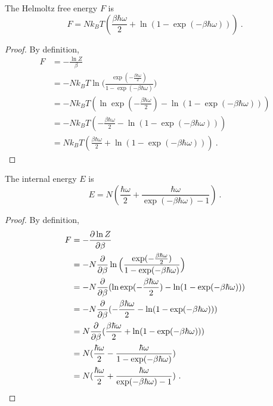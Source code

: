     The Helmoltz free energy $F$ is 
    \begin{equation*}
        F = N k_B T ( \frac{\beta \hbar \omega}{2} + \ln (1 - \exp(- \beta \hbar \omega))) ~.
    \end{equation*}
    \begin{proof}
        By definition, 
        \begin{equation*}
        \begin{aligned}
            F & = - \frac{\ln Z}{\beta} \\ & = - N k_B T \ln \Big ( \frac{\exp(- \frac{\beta \hbar \omega}{2})}{1 - \exp(- \beta \hbar \omega)} \Big) \\ & = - N k_B T ( \ln \exp(- \frac{\beta \hbar \omega}{2}) - \ln (1 - \exp(- \beta \hbar \omega) )) \\ & = - N k_B T ( - \frac{\beta \hbar \omega}{2} - \ln (1 - \exp(- \beta \hbar \omega))) \\ & = N k_B T ( \frac{\beta \hbar \omega}{2} + \ln (1 - \exp(- \beta \hbar \omega))) ~.
        \end{aligned}
        \end{equation*}
    \end{proof}

    The internal energy $E$ is 
    \begin{equation*}
        E = N ( \frac{\hbar \omega}{2} + \frac{\hbar \omega}{\exp(- \beta \hbar \omega) - 1} ) ~.
    \end{equation*}
    \begin{proof}
        By definition, 
        \begin{equation*}
        \begin{aligned}
            F & = - \frac{\partial\ln Z}{\partial\beta} \\ & = - N \frac{\partial}{\partial\beta} \ln \Big ( \frac{\exp(- \frac{\beta \hbar \omega}{2})}{1 - \exp(- \beta \hbar \omega)} \Big) \\ & = - N \frac{\partial}{\partial\beta} ( \ln \exp(- \frac{\beta \hbar \omega}{2}) - \ln (1 - \exp(- \beta \hbar \omega) )) \\ & = - N \frac{\partial}{\partial\beta} ( - \frac{\beta \hbar \omega}{2} - \ln (1 - \exp(- \beta \hbar \omega))) \\ & = N \frac{\partial}{\partial\beta} ( \frac{\beta \hbar \omega}{2} + \ln (1 - \exp(- \beta \hbar \omega))) \\ & = N ( \frac{\hbar \omega}{2} - \frac{\hbar \omega}{1 - \exp(- \beta \hbar \omega)} ) \\ & = N ( \frac{\hbar \omega}{2} + \frac{\hbar \omega}{\exp(- \beta \hbar \omega) - 1} ) ~.
        \end{aligned}
        \end{equation*}
    \end{proof}

